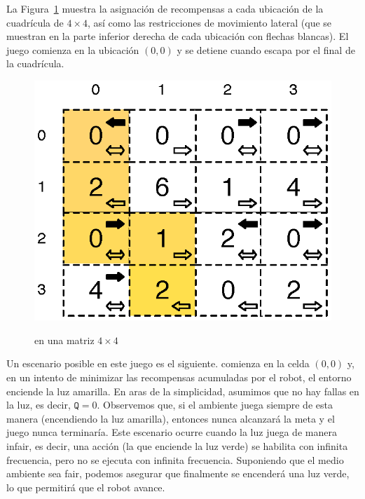 La Figura~\ref{fig:robot_game_grid} muestra la asignación de recompensas a cada ubicación de la cuadrícula de $4 \times 4$, así como las restricciones de movimiento lateral (que se muestran en la parte inferior derecha de cada ubicación con flechas blancas).
El juego comienza en la ubicación $(0, 0)$ y se detiene cuando \roborta escapa por el final de la cuadrícula.


\begin{figure}
\centering
{\fontsize{6.6}{6.6}\selectfont\ttfamily
\includegraphics[scale=0.65]{Figs/robotMovesRewards.eps}\hspace{1em}\mbox{}}
\caption{\roborta en una matriz $4 \times 4$} \label{fig:robot_game_grid}
\end{figure}

Un escenario posible en este juego es el siguiente. \roborta comienza en la celda $(0,0)$ y, en un intento de minimizar las recompensas acumuladas por el robot, el entorno enciende la luz amarilla.
En aras de la simplicidad, asumimos que no hay fallas en la luz, es decir, $\texttt{Q}=0$.
Observemos que, si el ambiente juega siempre de esta manera (encendiendo la luz amarilla), entonces \roborta nunca alcanzará la meta y
el juego nunca terminaría. Este escenario ocurre cuando la luz juega de manera infair, es decir, una acción (la que enciende la luz verde) se habilita con infinita frecuencia, pero no se ejecuta con infinita frecuencia.
Suponiendo que el medio ambiente sea fair, podemos asegurar que finalmente se encenderá una luz verde, lo que permitirá que el robot avance.

